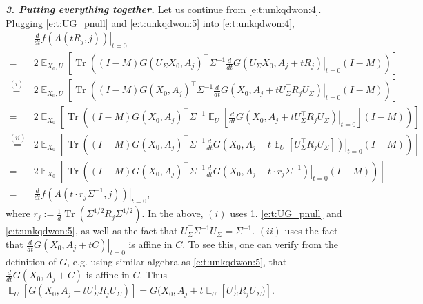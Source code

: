 \documentclass{article}
\DeclareMathOperator{\E}{\mathbb{E}}
\newcommand{\emphh}[1]{\textbf{\emph{#1}}}
\DeclareMathOperator{\tr}{Tr}
\newcommand*\lrb[1]{\left[ #1 \right]}
\newcommand*\lrp[1]{\left( #1 \right)}
\newcommand*\at[2]{\left.#1\right|_{#2}}
\newcommand{\US}{U_\Sigma}
\begin{document}
\underline{\emphh{3. Putting everything together.}} Let us continue from \eqref{e:t:unkqdwon:4}. Plugging \eqref{e:t:UG_pnull} and \eqref{e:t:unkqdwon:5} into \eqref{e:t:unkqdwon:4}, 
{\allowdisplaybreaks
\begin{align*}
& \at{\frac{d}{dt} f({A(tR_j,j)})}{t=0}\\
=& 2\E_{X_0, U} \lrb{\tr\lrp{\lrp{I-M} G(\US X_0, A_j )^\top \Sigma^{-1} \at{\frac{d}{dt} G(\US X_0, A_j + t R_j)}{t=0} \lrp{I-M}}}\\
\overset{(i)}{=}& 2\E_{X_0, U} \lrb{\tr\lrp{\lrp{I-M} G( X_0, A_j )^\top \Sigma^{-1} \at{\frac{d}{dt} G(X_0, A_j + t \US^{\top} R_j \US)}{t=0} \lrp{I-M}}}\\
=& 2\E_{X_0} \lrb{\tr\lrp{\lrp{I-M} G( X_0, A_j )^\top \Sigma^{-1} \E_{U}\lrb{\at{\frac{d}{dt} G(X_0, A_j + t \US^{\top} R_j \US)}{t=0}} \lrp{I-M}}}\\
\overset{(ii)}{=}& 2\E_{X_0} \lrb{\tr\lrp{\lrp{I-M} G( X_0, A_j )^\top \Sigma^{-1} \at{\frac{d}{dt} G(X_0, A_j + t \E_U\lrb{\US^{\top} R_j \US} )}{t=0} \lrp{I-M}}}\\
=& 2\E_{X_0} \lrb{\tr\lrp{\lrp{I-M} G( X_0, A_j )^\top \Sigma^{-1} \at{\frac{d}{dt} G(X_0, A_j + t \cdot r_j \Sigma^{-1})}{t=0} \lrp{I-M}}}\\
=& \at{\frac{d}{dt} f(A(t\cdot r_j \Sigma^{-1}, j))}{t=0},
\end{align*}
}
where $r_j := \frac{1}{d} \tr\lrp{\Sigma^{1/2} R_j \Sigma^{1/2}}$. In the above, $(i)$ uses 1. \eqref{e:t:UG_pnull} and \eqref{e:t:unkqdwon:5}, as well as the fact that $\US^\top \Sigma^{-1} \US = \Sigma^{-1}$. $(ii)$ uses the fact that $\at{\frac{d}{dt} G(X_0, A_j + t C)}{t=0}$ is affine in $C$. To see this, one can verify from the definition of $G$, e.g. using similar algebra as \eqref{e:t:unkqdwon:5}, that $\frac{d}{dt} G(X_0, A_j + C)$ is affine in $C$. Thus $\E_U\lrb{G(X_0, A_j + t \US^{\top} R_j \US)} = G(X_0, A_j + t \E_U\lrb{\US^{\top} R_j \US)}$. 
\end{document}
